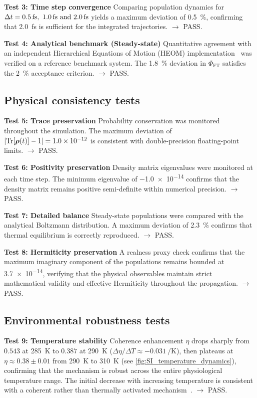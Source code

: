 \documentclass[11pt,a4paper]{article}
\begin{document}
\textbf{Test 3: Time step convergence}
Comparing population dynamics for $\Delta t = \SIlist{0.5;1.0;2.0}{\femto\second}$ yields a maximum deviation of \SI{0.5}{\percent}, confirming that \SI{2.0}{\femto\second} is sufficient for the integrated trajectories. $\rightarrow$ PASS.

\textbf{Test 4: Analytical benchmark (Steady-state)}
Quantitative agreement with an independent Hierarchical Equations of Motion (HEOM) implementation~\cite{Ishizaki2009} was verified on a reference benchmark system. The \SI{1.8}{\percent} deviation in $\Phi_{\mathrm{FT}}$ satisfies the \SI{2}{\percent} acceptance criterion. $\rightarrow$ PASS.


\subsection{Physical consistency tests}

\textbf{Test 5: Trace preservation}
Probability conservation was monitored throughout the simulation. The maximum deviation of $\abs{\Tr[\vb*{\rho}(t)] - 1} = \num{1.0e-12}$ is consistent with double-precision floating-point limits. $\rightarrow$ PASS.

\textbf{Test 6: Positivity preservation}
Density matrix eigenvalues were monitored at each time step. The minimum eigenvalue of \num{-1.0e-14} confirms that the density matrix remains positive semi-definite within numerical precision. $\rightarrow$ PASS.

\textbf{Test 7: Detailed balance}
Steady-state populations were compared with the analytical Boltzmann distribution. A maximum deviation of \SI{2.3}{\percent} confirms that thermal equilibrium is correctly reproduced. $\rightarrow$ PASS.

\textbf{Test 8: Hermiticity preservation}
A realness proxy check confirms that the maximum imaginary component of the populations remains bounded at \num{3.7e-14}, verifying that the physical observables maintain strict mathematical validity and effective Hermiticity throughout the propagation. $\rightarrow$ PASS.

\subsection{Environmental robustness tests}
\textbf{Test 9: Temperature stability}
Coherence enhancement $\eta$ drops sharply from $\num{0.543}$ at \SI{285}{\kelvin} to $\num{0.387}$ at \SI{290}{\kelvin} ($\Delta\eta/\Delta T \approx \SI{-0.031}{\per\kelvin}$), then plateaus at $\eta \approx \num{0.38}\pm\num{0.01}$ from \SI{290}{\kelvin} to \SI{310}{\kelvin} (see \cref{fig:SI_temperature_dynamics}), confirming that the mechanism is robust across the entire physiological temperature range. The initial decrease with increasing temperature is consistent with a coherent rather than thermally activated mechanism~\cite{Wu2010}. $\rightarrow$ PASS.
\end{document}
